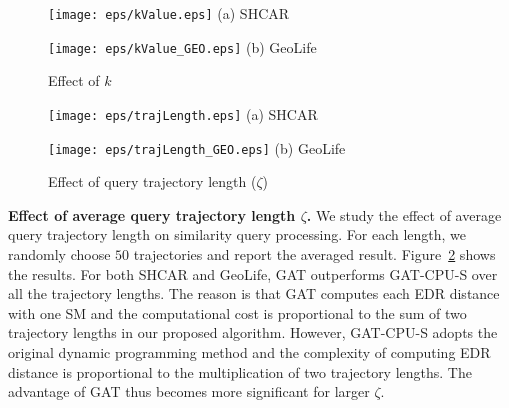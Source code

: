 \documentclass[10pt,conference,letterpaper]{IEEEtran}
\newcommand{\frname}{GAT\xspace }
\begin{document}

\begin{figure}[t]\centering
	\scriptsize{
		\begin{minipage}{0.48\linewidth}
			\centering
			\texttt{[image: eps/kValue.eps]}
			(a) SHCAR
		\end{minipage}
		\hfill
		\begin{minipage}{0.48\linewidth}
			\centering
			\texttt{[image: eps/kValue\_GEO.eps]}
			(b) GeoLife
		\end{minipage}
	}
	\caption{Effect of $k$ \label{fig:kValue}}
	\vspace{-.1in}
\end{figure}

\begin{figure}[t]\centering
	\scriptsize{
		\begin{minipage}{0.48\linewidth}
			\centering
			\texttt{[image: eps/trajLength.eps]}
			(a) SHCAR
		\end{minipage}
		\hfill
		\begin{minipage}{0.48\linewidth}
			\centering
			\texttt{[image: eps/trajLength\_GEO.eps]}
			(b) GeoLife
		\end{minipage}
	}
	\caption{Effect of query trajectory length ($\zeta$) \label{fig:LENSIMI}}
	\vspace{-.1in}
\end{figure}

\vspace{0.1cm}\textbf{Effect of average query trajectory length $\zeta$.}
We study the effect of average query trajectory length on similarity query processing. For each length, we randomly choose $50$ trajectories and report the averaged result.
Figure~\ref{fig:LENSIMI} shows the results.
For both SHCAR and GeoLife, \frname outperforms \frname-CPU-S over all the trajectory lengths.
The reason is that \frname computes each EDR distance with one SM and the computational cost is proportional to the sum of two trajectory lengths in our proposed algorithm.
However, \frname-CPU-S adopts the original dynamic programming method and the complexity of computing EDR distance is proportional to the multiplication of two trajectory lengths.
The advantage of \frname thus becomes more significant for larger $\zeta$.
\end{document}

